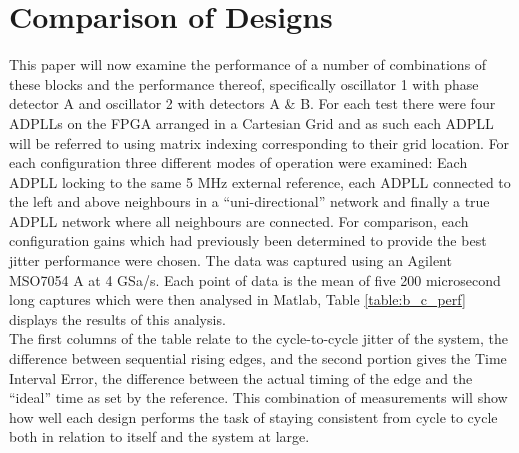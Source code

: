 \documentclass[conference]{IEEEtran}
\begin{document}
\section{Comparison of Designs}
This paper will now examine the performance of a number of combinations of these blocks and the performance thereof, specifically oscillator 1 with phase detector A and oscillator 2 with detectors A \& B. For each test there were four ADPLLs on the FPGA arranged in a Cartesian Grid and as such each ADPLL will be referred to using matrix indexing corresponding to their grid location. For each configuration three different modes of operation were examined: Each ADPLL locking to the same 5 MHz external reference, each ADPLL connected to the left and above neighbours in a ``uni-directional'' network and finally a true ADPLL network where all neighbours are connected. For comparison, each configuration gains which had previously been determined to provide the best jitter performance were chosen. The data was captured using an Agilent MSO7054 A at 4 GSa/s. Each point of data is the mean of five 200 microsecond long captures which were then analysed in Matlab, Table \ref{table:b_c_perf} displays the results of this analysis.\\
The first columns of the table relate to the cycle-to-cycle jitter of the system, the difference between sequential rising edges, and the second portion gives the Time Interval Error, the difference between the actual timing of the edge and the ``ideal'' time as set by the reference. This combination of measurements will show how well each design performs the task of staying consistent from cycle to cycle both in relation to itself and the system at large.
\end{document}
